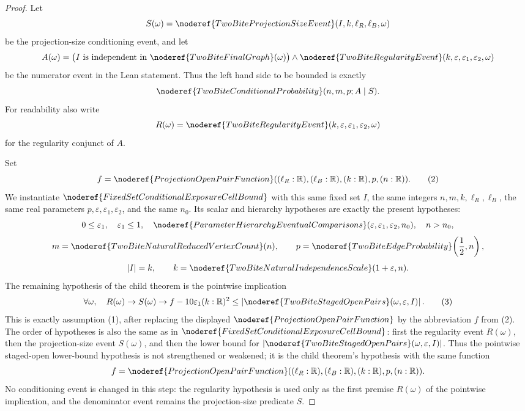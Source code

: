 \begin{proof}
Let
\[
S(\omega)=
\noderef{TwoBiteProjectionSizeEvent}(I,k,\ell_R,\ell_B,\omega)
\]
be the projection-size conditioning event, and let
\[
A(\omega)=
\bigl(I\text{ is independent in }\noderef{TwoBiteFinalGraph}(\omega)\bigr)
\wedge
\noderef{TwoBiteRegularityEvent}(k,\varepsilon,\varepsilon_1,\varepsilon_2,
\omega)
\]
be the numerator event in the Lean statement.  Thus the left hand side to be
bounded is exactly
\[
\noderef{TwoBiteConditionalProbability}(n,m,p; A\mid S).
\]
For readability also write
\[
R(\omega)=
\noderef{TwoBiteRegularityEvent}(k,\varepsilon,\varepsilon_1,\varepsilon_2,\omega)
\]
for the regularity conjunct of \(A\).

Set
\[
f=
\noderef{ProjectionOpenPairFunction}
  ((\ell_R:\mathbb R),(\ell_B:\mathbb R),(k:\mathbb R),p,(n:\mathbb R)).
\tag{2}
\]
We instantiate \(\noderef{FixedSetConditionalExposureCellBound}\) with this
same fixed set \(I\), the same integers \(n,m,k,\ell_R,\ell_B\), the same real
parameters \(p,\varepsilon,\varepsilon_1,\varepsilon_2\), and the same
\(n_0\).  Its scalar and hierarchy hypotheses are exactly the present
hypotheses:
\[
0\le\varepsilon_1,\quad \varepsilon_1\le1,\quad
\noderef{ParameterHierarchyEventualComparisons}
(\varepsilon,\varepsilon_1,\varepsilon_2,n_0),\quad n>n_0,
\]
\[
m=\noderef{TwoBiteNaturalReducedVertexCount}(n),\qquad
p=\noderef{TwoBiteEdgeProbability}\!\left(\frac12,n\right),
\]
\[
|I|=k,\qquad
k=\noderef{TwoBiteNaturalIndependenceScale}(1+\varepsilon,n).
\]
The remaining hypothesis of the child theorem is the pointwise implication
\[
\forall\omega,\quad
R(\omega)\to S(\omega)\to
f-10\varepsilon_1(k:\mathbb R)^2
\le
\left|\noderef{TwoBiteStagedOpenPairs}(\omega,\varepsilon,I)\right|.
\tag{3}
\]
This is exactly assumption (1), after replacing the displayed
\(\noderef{ProjectionOpenPairFunction}\) by the abbreviation \(f\) from (2).
The order of hypotheses is also the same as in
\(\noderef{FixedSetConditionalExposureCellBound}\): first the regularity
event \(R(\omega)\), then the projection-size event \(S(\omega)\), and then
the lower bound for
\(\left|\noderef{TwoBiteStagedOpenPairs}(\omega,\varepsilon,I)\right|\).
Thus the pointwise staged-open lower-bound hypothesis is not strengthened or
weakened; it is the child theorem's hypothesis with the same function
\[
f=\noderef{ProjectionOpenPairFunction}
  ((\ell_R:\mathbb R),(\ell_B:\mathbb R),(k:\mathbb R),p,(n:\mathbb R)).
\]
No conditioning event is changed in this step: the regularity hypothesis is
used only as the first premise \(R(\omega)\) of the pointwise implication,
and the denominator event remains the projection-size predicate \(S\).


\end{proof}
